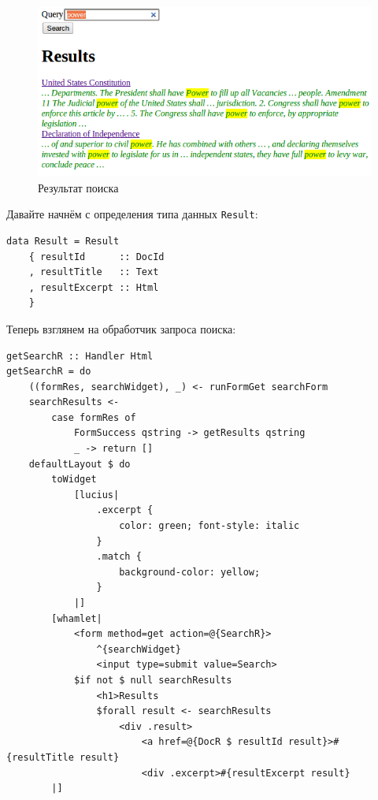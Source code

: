 \begin{figure}[hbt]
    \begin{center}
        \includegraphics[width=\textwidth]{case-study-sphinx/search-results.png}
        \caption{Результат поиска}\label{Fig:search_results}
    \end{center}
\end{figure}

Давайте начнём с определения типа данных \lstinline'Result':
\begin{lstlisting}
data Result = Result
    { resultId      :: DocId
    , resultTitle   :: Text
    , resultExcerpt :: Html
    }
\end{lstlisting}

Теперь взглянем на обработчик запроса поиска: %
\begin{lstlisting}
getSearchR :: Handler Html
getSearchR = do
    ((formRes, searchWidget), _) <- runFormGet searchForm
    searchResults <-
        case formRes of
            FormSuccess qstring -> getResults qstring
            _ -> return []
    defaultLayout $ do
        toWidget
            [lucius|
                .excerpt {
                    color: green; font-style: italic
                }
                .match {
                    background-color: yellow;
                }
            |]
        [whamlet|
            <form method=get action=@{SearchR}>
                ^{searchWidget}
                <input type=submit value=Search>
            $if not $ null searchResults
                <h1>Results
                $forall result <- searchResults
                    <div .result>
                        <a href=@{DocR $ resultId result}>#{resultTitle result}
                        <div .excerpt>#{resultExcerpt result}
        |]
\end{lstlisting}%

